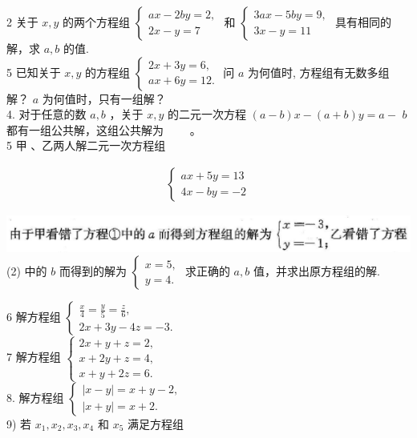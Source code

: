 \documentclass[10pt]{article}
\begin{document}
2 关于 $x, y$ 的两个方程组 $\left\{\begin{array}{l}a x-2 b y=2, \\ 2 x-y=7\end{array}\right.$ 和 $\left\{\begin{array}{l}3 a x-5 b y=9, \\ 3 x-y=11\end{array}\right.$ 具有相同的解，求 $a, b$ 的值.\\
5 已知关于 $x, y$ 的方程组 $\left\{\begin{array}{l}2 x+3 y=6, \\ a x+6 y=12 .\end{array}\right.$ 问 $a$ 为何值时, 方程组有无数多组解？ $a$ 为何值时，只有一组解？\\
4. 对于任意的数 $a, b$ ，关于 $x, y$ 的二元一次方程 $(a-b) x-(a+b) y=a-$ $b$ 都有一组公共解，这组公共解为 $\qquad$。\\
5 甲 、乙两人解二元一次方程组

\begin{align*}
\left\{\begin{array}{l}
a x+5 y=13  \tag{1}\\
4 x-b y=-2
\end{array}\right.
\end{align*}

\includegraphics[max width=\textwidth]{2024_10_30_26b590fd1106d28139f0g-030(1)} (2) 中的 $b$ 而得到的解为 $\left\{\begin{array}{l}x=5, \\ y=4 .\end{array}\right.$ 求正确的 $a, b$ 值，并求出原方程组的解.

6 解方程组 $\left\{\begin{array}{l}\frac{x}{4}=\frac{y}{5}=\frac{z}{6}, \\ 2 x+3 y-4 z=-3 .\end{array}\right.$\\
7 解方程组 $\left\{\begin{array}{l}2 x+y+z=2, \\ x+2 y+z=4, \\ x+y+2 z=6 .\end{array}\right.$\\
8. 解方程组 $\left\{\begin{array}{l}|x-y|=x+y-2, \\ |x+y|=x+2 .\end{array}\right.$\\
9) 若 $x_{1}, x_{2}, x_{3}, x_{4}$ 和 $x_{5}$ 满足方程组
\end{document}
